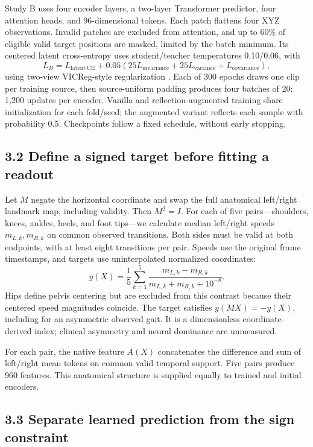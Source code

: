\documentclass{article}
\begin{document}
Study B uses four encoder layers, a two-layer Transformer predictor,
four attention heads, and 96-dimensional tokens. Each patch flattens
four XYZ observations. Invalid patches are excluded from attention, and
up to 60\% of eligible valid target positions are masked, limited by the
batch minimum. Its centered latent cross-entropy uses student/teacher
temperatures 0.10/0.06, with \[
L_B=L_{\mathrm{latent\,CE}}+0.05(25L_{\mathrm{invariance}}+
25L_{\mathrm{variance}}+L_{\mathrm{covariance}}),
\] using two-view VICReg-style regularization \citep{bardes2022vicreg}.
Each of 300 epochs draws one clip per training source, then
source-uniform padding produces four batches of 20: 1,200 updates per
encoder. Vanilla and reflection-augmented training share initialization
for each fold/seed; the augmented variant reflects each sample with
probability 0.5. Checkpoints follow a fixed schedule, without early
stopping.

\subsection{3.2 Define a signed target before fitting a
readout}\label{define-a-signed-target-before-fitting-a-readout}

Let \(M\) negate the horizontal coordinate and swap the full anatomical
left/right landmark map, including validity. Then \(M^2=I\). For each of
five pairs---shoulders, knees, ankles, heels, and foot tips---we
calculate median left/right speeds \(m_{L,k},m_{R,k}\) on common
observed transitions. Both sides must be valid at both endpoints, with
at least eight transitions per pair. Speeds use the original frame
timestamps, and targets use uninterpolated normalized coordinates: \[
y(X)=\frac{1}{5}\sum_{k=1}^{5}
\frac{m_{L,k}-m_{R,k}}{m_{L,k}+m_{R,k}+10^{-8}}.
\] Hips define pelvis centering but are excluded from this contrast
because their centered speed magnitudes coincide. The target satisfies
\(y(MX)=-y(X)\), including for an asymmetric observed gait. It is a
dimensionless coordinate-derived index; clinical asymmetry and neural
dominance are unmeasured.

For each pair, the native feature \(A(X)\) concatenates the difference
and sum of left/right mean tokens on common valid temporal support. Five
pairs produce 960 features. This anatomical structure is supplied
equally to trained and initial encoders.

\subsection{3.3 Separate learned prediction from the sign
constraint}\label{separate-learned-prediction-from-the-sign-constraint}
\end{document}
